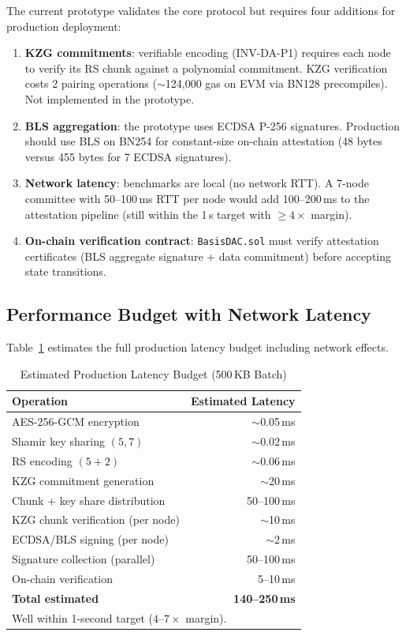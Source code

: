 The current prototype validates the core protocol but requires four
additions for production deployment:

\begin{enumerate}
  \item \textbf{KZG commitments}: verifiable encoding (INV-DA-P1)
    requires each node to verify its RS chunk against a polynomial
    commitment. KZG verification costs 2 pairing operations
    ($\sim$124{,}000 gas on EVM via BN128 precompiles). Not implemented
    in the prototype.
  \item \textbf{BLS aggregation}: the prototype uses ECDSA P-256
    signatures. Production should use BLS on BN254 for constant-size
    on-chain attestation (48 bytes versus 455 bytes for 7 ECDSA
    signatures).
  \item \textbf{Network latency}: benchmarks are local (no network RTT).
    A 7-node committee with 50--100\,ms RTT per node would add
    100--200\,ms to the attestation pipeline (still within the 1\,s
    target with $\geq 4\times$ margin).
  \item \textbf{On-chain verification contract}: \texttt{BasisDAC.sol}
    must verify attestation certificates (BLS aggregate signature +
    data commitment) before accepting state transitions.
\end{enumerate}

\subsection{Performance Budget with Network Latency}

Table~\ref{tab:budget} estimates the full production latency budget
including network effects.

\begin{table}[t]
\centering
\caption{Estimated Production Latency Budget (500\,KB Batch)}
\label{tab:budget}
\begin{tabular}{@{}lr@{}}
\toprule
\textbf{Operation} & \textbf{Estimated Latency} \\
\midrule
AES-256-GCM encryption              & $\sim$0.05\,ms \\
Shamir key sharing $(5,7)$           & $\sim$0.02\,ms \\
RS encoding $(5{+}2)$               & $\sim$0.06\,ms \\
KZG commitment generation           & $\sim$20\,ms \\
Chunk + key share distribution       & 50--100\,ms \\
KZG chunk verification (per node)    & $\sim$10\,ms \\
ECDSA/BLS signing (per node)         & $\sim$2\,ms \\
Signature collection (parallel)      & 50--100\,ms \\
On-chain verification                & 5--10\,ms \\
\midrule
\textbf{Total estimated}             & \textbf{140--250\,ms} \\
\bottomrule
\multicolumn{2}{l}{\footnotesize Well within 1-second target ($4$--$7\times$ margin).} \\
\end{tabular}
\end{table}


